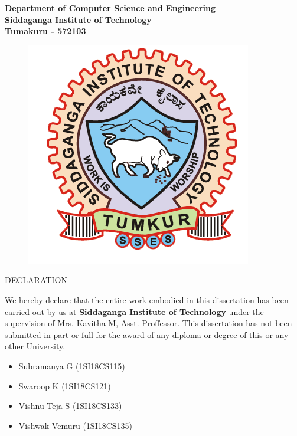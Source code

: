 \begin{center}
\bfseries
\large{Department of Computer Science and Engineering\\
Siddaganga Institute of Technology \\
Tumakuru - 572103} \\
\begin{figure}[hbtp]
\centering
\includegraphics[scale=1]{../ThesisFigs/College_logo.png}
\end{figure}
\LARGE{DECLARATION} \\
\end{center}
\vspace{0.5in}
\normalsize{
We hereby declare that the entire work embodied in this dissertation has been carried out by us at \textbf{Siddaganga Institute of Technology} under the supervision of Mrs. Kavitha M, Asst. Proffessor. This dissertation has not been submitted in part or full for the award of any diploma or degree of this or any other University.} \\
\vspace{0.5in}
\begin{flushleft}
\begin{itemize}
	\item Subramanya G (1SI18CS115)
	\item Swaroop K (1SI18CS121)
	\item Vishnu Teja S (1SI18CS133)
	\item Vishwak Vemuru (1SI18CS135)
\end{itemize}
\end{flushleft}


